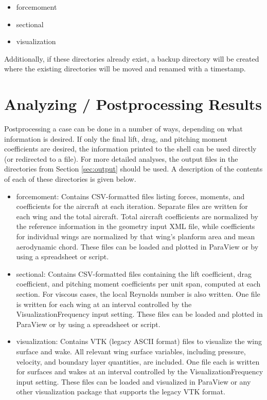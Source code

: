 \documentclass[11pt]{article}
\begin{document}
\begin{itemize}
	\item forcemoment
	\item sectional
	\item visualization
\end{itemize}

Additionally, if these directories already exist, a backup directory will be
created where the existing directories will be moved and renamed with a
timestamp.

\section{Analyzing / Postprocessing Results}

Postprocessing a case can be done in a number of ways, depending on what
information is desired. If only the final lift, drag, and pitching moment
coefficients are desired, the information printed to the shell can be used
directly (or redirected to a file). For more detailed analyses, the output files
in the directories from Section \ref{sec:output} should be used. A description
of the contents of each of these directories is given below.

\begin{itemize}
	\item forcemoment: Contains CSV-formatted files listing forces, moments, and
		coefficients for the aircraft at each iteration. Separate files are
		written for each wing and the total aircraft. Total aircraft
		coefficients are normalized by the reference information in the geometry
		input XML file, while coefficients for individual wings are normalized
		by that wing's planform area and mean aerodynamic chord. These files
		can be loaded and plotted in ParaView or by using a spreadsheet or
		script.
	\item sectional: Contains CSV-formatted files containing the lift
		coefficient, drag coefficient, and pitching moment coefficients per unit
		span, computed at each section. For viscous cases, the local Reynolds
		number is also written. One file is written for each wing at an interval
		controlled by the VisualizationFrequency input setting. These files can
		be loaded and plotted in ParaView or by using a spreadsheet or script.
	\item visualization: Contains VTK (legacy ASCII format) files to visualize
		the wing surface and wake. All relevant wing surface variables,
		including pressure, velocity, and boundary layer quantities, are
		included. One file each is written for surfaces and wakes at an interval
		controlled by the VisualizationFrequency input setting. These files can
		be loaded and visualized in ParaView or any other visualization package
		that supports the legacy VTK format.
\end{itemize}
\end{document}
